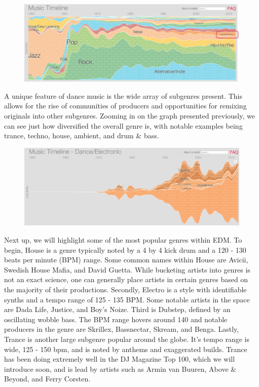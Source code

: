 \documentclass[12pt]{dalcsthesis}
\begin{document}
\begin{figure}[h]
\includegraphics[scale=.49]{genre_graph}
\centering
\end{figure}

A unique feature of dance music is the wide array of subgenres present. This allows for the rise of communities of producers and opportunities for remixing originals into other subgenres. Zooming in on the graph presented previously, we can see just how diversified the overall genre is, with notable examples being trance, techno, house, ambient, and drum \& bass. \newpage

\begin{figure}[h]
\includegraphics[scale=.65]{subgenre_graph}
\centering
\end{figure}

Next up, we will highlight some of the most popular genres within EDM. To begin, House is a genre typically noted by a 4 by 4 kick drum and a 120 - 130 beats per minute (BPM) range. Some common names within House are Avicii, Swedish House Mafia, and David Guetta. While bucketing artists into genres is not an exact science, one can generally place artists in certain genres based on the majority of their productions. Secondly, Electro is a style with identifiable synths and a tempo range of 125 - 135 BPM. Some notable artists in the space are Dada Life, Justice, and Boy's Noize. Third is Dubstep, defined by an oscillating wobble bass. The BPM range hovers around 140 and notable producers in the genre are Skrillex, Bassnectar, Skream, and Benga. Lastly, Trance is another large subgenre popular around the globe. It's tempo range is wide, 125 - 150 bpm, and is noted by anthems and exaggerated builds. Trance has been doing extremely well in the DJ Magazine Top 100, which we will introduce soon, and is lead by artists such as Armin van Buuren, Above \& Beyond, and Ferry Corsten.
\end{document}
